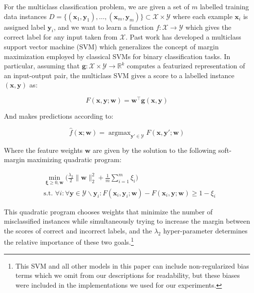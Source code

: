 \documentclass{article} %
\DeclareMathOperator*{\argmax}{argmax}
\begin{document}
For the multiclass classification problem, we are given a set of
$m$ labelled training data instances
$D=\{(\mathbf{x}_1,\mathbf{y}_1),\hdots,(\mathbf{x}_m, \mathbf{y}_m)\}\subset\mathcal{X}\times\mathcal{Y}$ 
where each example $\mathbf{x}_i$ is assigned label 
$\mathbf{y}_i$, and we want to learn a function 
$f:\mathcal{X}\rightarrow\mathcal{Y}$ which gives the correct
label for any input taken from $\mathcal{X}$.  Past work has developed
a multiclass support vector machine (SVM) which generalizes the 
concept of margin maximization employed by classical SVMs for binary
classification tasks. In particular, assuming that
$\mathbf{g}:\mathcal{X}\times\mathcal{Y}\rightarrow \mathbb{R}^k$ 
computes a featurized representation of an input-output pair, the 
multiclass SVM gives a score to a labelled instance $(\mathbf{x},\mathbf{y})$ 
as:

\begin{equation}
\label{score}
F(\mathbf{x},\mathbf{y};\mathbf{w})= \mathbf{w}^\top \mathbf{g}(\mathbf{x},\mathbf{y})
\end{equation}

And makes predictions according to:

\begin{equation}
\label{prediction}
\hat{f}(\mathbf{x};\mathbf{w})=\argmax_{\mathbf{y}'\in\mathcal{Y}} F(\mathbf{x},\mathbf{y}';\mathbf{w})
\end{equation}

Where the feature weights $\mathbf{w}$ are given by the
solution to the following soft-margin maximizing quadratic program:

\begin{equation}
\begin{split}
& \min_{\mathbf{\xi}\geq 0, \mathbf{w}}\big(\frac{\lambda_2}{2}\|\mathbf{w}\|_2^2+\frac{1}{m}\sum_{i=1}^m\xi_i\big) \\
& \text{s.t.     } \forall i : \forall \mathbf{y}\in\mathcal{Y}\backslash\mathbf{y}_i : F(\mathbf{x}_i,\mathbf{y}_i;\mathbf{w})-F(\mathbf{x}_i,\mathbf{y};\mathbf{w})\geq 1-\xi_i
\end{split}
\end{equation}

This quadratic program chooses weights that minimize
the number of misclassified instances while simultaneously
trying to increase the margin between the scores of 
correct and incorrect labels, and the $\lambda_2$
hyper-parameter determines the relative importance of
these two goals.\footnote{This SVM and all other models in
this paper can include non-regularized bias terms which
we omit from our descriptions for readability, but these
biases were included in the implementations we used for
our experiments.}
\end{document}

